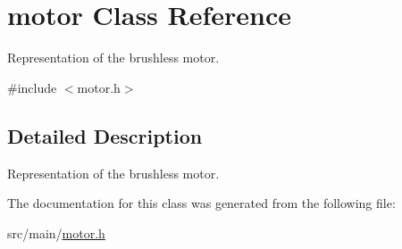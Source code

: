 \hypertarget{classmotor}{}\section{motor Class Reference}
\label{classmotor}


Representation of the brushless motor.  




{\ttfamily \#include $<$motor.\+h$>$}



\subsection{Detailed Description}
Representation of the brushless motor. 

The documentation for this class was generated from the following file\+:\begin{DoxyCompactItemize}
\item 
src/main/\hyperlink{motor_8h}{motor.\+h}\end{DoxyCompactItemize}

